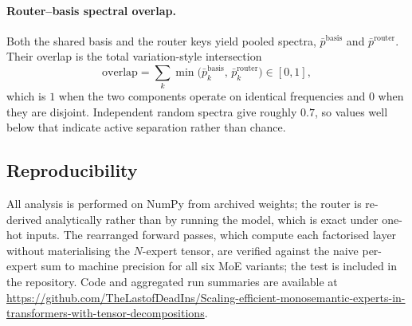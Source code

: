 \paragraph{Router--basis spectral overlap.} Both the shared basis and the
router keys yield pooled spectra, $\bar{p}^{\mathrm{basis}}$ and
$\bar{p}^{\mathrm{router}}$. Their overlap is the total variation-style
intersection
\begin{equation}
  \mathrm{overlap} = \sum_k \min\!\big(\bar{p}^{\mathrm{basis}}_k,\,
  \bar{p}^{\mathrm{router}}_k\big) \in [0,1],
\end{equation}
which is $1$ when the two components operate on identical frequencies and $0$
when they are disjoint. Independent random spectra give roughly $0.7$, so
values well below that indicate active separation rather than chance.

\subsection{Reproducibility}

All analysis is performed on NumPy from archived weights; the router is
re-derived analytically rather than by running the model, which is exact under
one-hot inputs. The rearranged forward passes, which compute each factorised
layer without materialising the $N$-expert tensor, are verified against the
naive per-expert sum to machine precision for all six MoE variants; the test
is included in the repository. Code and aggregated run summaries are available at
\url{https://github.com/TheLastofDeadIns/Scaling-efficient-monosemantic-experts-in-transformers-with-tensor-decompositions}.